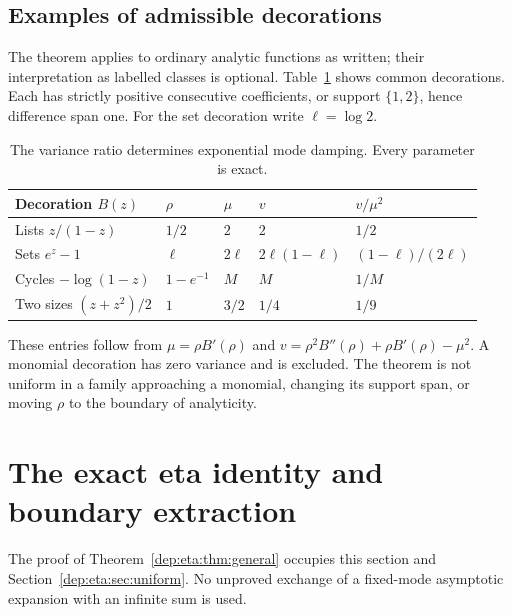 \documentclass[11pt]{article}
\theoremstyle{definition}\newtheorem{definition}[theorem]{Definition}
\theoremstyle{remark}\newtheorem{remark}[theorem]{Remark}
\begin{document}
\subsection{Examples of admissible decorations}
The theorem applies to ordinary analytic functions as written; their
interpretation as labelled classes is optional. Table~\ref{dep:eta:tab:B}
shows common decorations. Each has strictly positive consecutive
coefficients, or support $\{1,2\}$, hence difference span one.
For the set decoration write $\ell=\log2$.
\begin{table}[htbp]
\centering
\small
\begin{tabular}{lllll}
\toprule
Decoration $B(z)$ & $\rho$ & $\mu$ & $v$ & $v/\mu^2$\\
\midrule
Lists $z/(1-z)$ & $1/2$ & $2$ & $2$ & $1/2$\\
Sets $e^z-1$ & $\ell$ & $2\ell$ & $2\ell(1-\ell)$ & $(1-\ell)/(2\ell)$\\
Cycles $-\log(1-z)$ & $1-e^{-1}$ & $M$ & $M$ & $1/M$\\
Two sizes $(z+z^2)/2$ & $1$ & $3/2$ & $1/4$ & $1/9$\\
\bottomrule
\end{tabular}
\caption{The variance ratio determines exponential mode damping.
Every parameter is exact.}\label{dep:eta:tab:B}
\end{table}
These entries follow from $\mu=\rho B'(\rho)$ and
$v=\rho^2B''(\rho)+\rho B'(\rho)-\mu^2$. A monomial decoration
has zero variance and is excluded. The theorem is not uniform in a
family approaching a monomial, changing its support span, or moving
$\rho$ to the boundary of analyticity.

\section{The exact eta identity and boundary extraction}\label{dep:eta:sec:boundary}
The proof of Theorem~\ref{dep:eta:thm:general} occupies this section and
Section~\ref{dep:eta:sec:uniform}. No unproved exchange of a fixed-mode
asymptotic expansion with an infinite sum is used.
\end{document}
